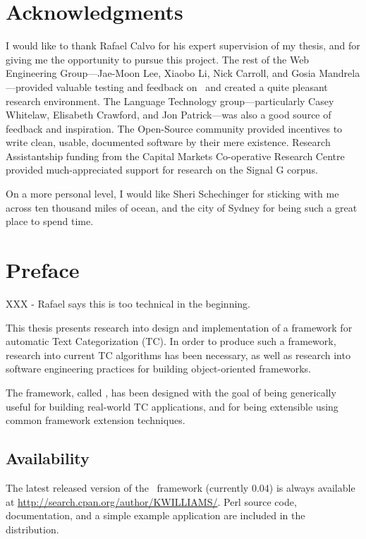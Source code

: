 \chapter{Acknowledgments}

I would like to thank Rafael Calvo for his expert supervision of my
thesis, and for giving me the opportunity to pursue this project.  The
rest of the Web Engineering Group---Jae-Moon Lee, Xiaobo Li, Nick
Carroll, and Gosia Mandrela---provided valuable testing and feedback
on \aicat\ and created a quite pleasant research environment.  The
Language Technology group---particularly Casey Whitelaw, Elisabeth
Crawford, and Jon Patrick---was also a good source of feedback and
inspiration.  The Open-Source community provided incentives to write
clean, usable, documented software by their mere existence.  Research
Assistantship funding from the Capital Markets Co-operative Research
Centre provided much-appreciated support for research on the Signal G
corpus.

On a more personal level, I would like Sheri Schechinger for sticking
with me across ten thousand miles of ocean, and the city of Sydney for
being such a great place to spend time.

\chapter{Preface}

XXX - Rafael says this is too technical in the beginning.

This thesis presents research into design and implementation of a framework
for automatic Text Categorization (TC).  In order to produce such a
framework, research into current TC algorithms has been necessary, as
well as research into software engineering practices for building
object-oriented frameworks.

The framework, called \aicat, has been designed with the goal of being
generically useful for building real-world TC applications, and for
being extensible using common framework extension techniques.

\section*{Availability}

The latest released version of the \aicat\ framework (currently 0.04)
is always available at
\url{http://search.cpan.org/author/KWILLIAMS/}.  Perl source code,
documentation, and a simple example application are included in the
distribution.

